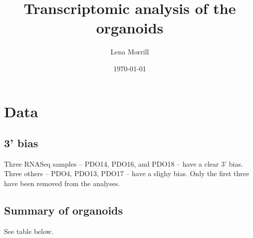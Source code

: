 \documentclass{article}
\author{Lena Morrill}
\date{\today}
\title{Transcriptomic analysis of the organoids}
\begin{document}
\maketitle

\tableofcontents

\section{Data}
\subsection{3' bias}

Three RNASeq samples -- PDO14, PDO16, and PDO18 -- have a clear 3' bias. Three others -- PDO4, PDO13, PDO17 -- have a slighy bias. Only the first three have been removed from the analyses.

\subsection{Summary of organoids}
See table below.

\end{document}
